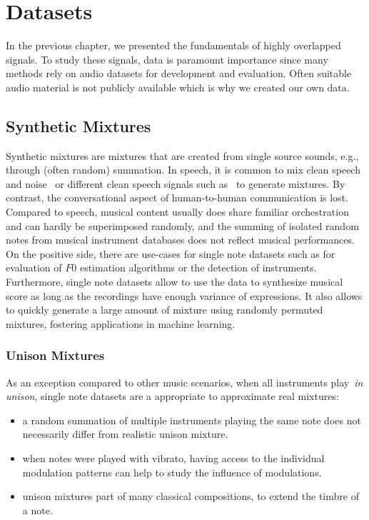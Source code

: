 \chapter{Datasets}
\label{cha:datasets}

In the previous chapter, we presented the fundamentals of highly overlapped signals.
To study these signals, data is paramount importance since many methods rely on audio datasets for development and evaluation.
Often suitable audio material is not publicly available which is why we created our own data.

\section{Synthetic Mixtures}

Synthetic mixtures are mixtures that are created from single source sounds, e.g., through (often random) summation. 
In speech, it is common to mix clean speech and noise~\cite{varga93} or different clean speech signals such as~\cite{garofolo93} to generate mixtures.
By contrast, the conversational aspect of human-to-human communication is lost.
Compared to speech, musical content usually does share familiar orchestration and can hardly be superimposed randomly, and the summing of isolated random notes from musical instrument databases does not reflect musical performances.
On the positive side, there are use-cases for single note datasets such as for evaluation of \(F0\) estimation algorithms or the detection of instruments.
Furthermore, single note datasets allow to use the data to synthesize musical score as long as the recordings have enough variance of expressions.
It also allows to quickly generate a large amount of mixture using randomly permuted mixtures, fostering applications in machine learning.

\subsection{Unison Mixtures}
\label{sec:unison_dataset}


As an exception compared to other music scenarios, when all instruments play~\emph{in unison}, single note datasets are a appropriate to approximate real mixtures:

\begin{itemize}
  \item a random summation of multiple instruments playing the same note does not necessarily differ from realistic unison mixture.
  \item when notes were played with vibrato, having access to the individual modulation patterns can help to study the influence of modulations.
  \item unison mixtures part of many classical compositions, to extend the timbre of a note.
\end{itemize}

